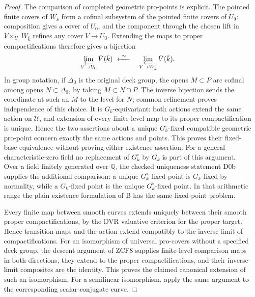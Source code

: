 \begin{proof}
The comparison of completed geometric pro-points is explicit.
The pointed finite covers of $W_{\bar k}$ form a cofinal
subsystem of the pointed finite covers of $U_0$: composition
gives a cover of $U_0$, and the component through the chosen
lift in $V\times_{U_0}W_{\bar k}$ refines any cover
$V\to U_0$. Extending the maps to proper compactifications
therefore gives a bijection
\[
 \varprojlim_{V\to U_0}\bar V(\bar k)
 \ \xleftarrow{\ \sim\ }\quad
 \varprojlim_{V\to W_{\bar k}}\bar V(\bar k).
\]
In group notation, if $\Delta_0$ is the original deck group,
the opens $M\subset P$ are cofinal among opens $N\subset
\Delta_0$, by taking $M\subset N\cap P$. The inverse
bijection sends the coordinate at such an $M$ to the level
for $N$; common refinement proves independence of this choice.
It is $G_k$-equivariant: both actions extend the same action
on $\mathcal U$, and extension of every finite-level map to
its proper compactification is unique. Hence the two assertions
about a unique $G_k^\circ$-fixed compatible geometric pro-point
concern exactly the same actions and points. This proves their
fixed-base equivalence without proving either existence assertion.
For a general characteristic-zero field no replacement of
$G_k^\circ$ by $G_k$ is part of this argument. Over a field
finitely generated over $\mathbb Q$, the checked uniqueness
statement D0b \cite{PriorCyclotomic} supplies the additional
comparison: a unique $G_k^\circ$-fixed point is $G_k$-fixed by
normality, while a $G_k$-fixed point is the unique
$G_k^\circ$-fixed point. In that arithmetic range the plain
existence formulation of B has the same fixed-point problem.

Every finite map between smooth curves extends uniquely between
their smooth proper compactifications, by the DVR valuative
criterion for the proper target. Hence transition maps and the
action extend compatibly to the inverse limit of compactifications.
For an isomorphism of universal pro-covers without a specified
deck group, the descent argument of ZCF8 supplies finite-level
comparison maps in both directions; they extend to the proper
compactifications, and their inverse-limit composites are the
identity. This proves the claimed canonical extension of such an
isomorphism. For a semilinear isomorphism, apply the same argument
to the corresponding scalar-conjugate curve.


\end{proof}
